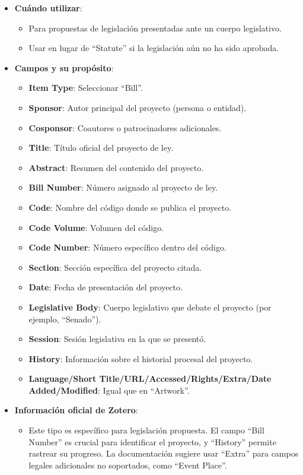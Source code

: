 \documentclass[
  jou,
  floatsintext,
  longtable,
  a4paper,
  nolmodern,
  notxfonts,
  notimes,
  colorlinks=true,linkcolor=blue,citecolor=blue,urlcolor=blue]{apa7}
\providecommand{\tightlist}{%
  \setlength{\itemsep}{0pt}\setlength{\parskip}{0pt}}
\begin{document}
\begin{itemize}
\tightlist
\item
  \textbf{Cuándo utilizar}:

  \begin{itemize}
  \tightlist
  \item
    Para propuestas de legislación presentadas ante un cuerpo
    legislativo.
  \item
    Usar en lugar de ``Statute'' si la legislación aún no ha sido
    aprobada.
  \end{itemize}
\item
  \textbf{Campos y su propósito}:

  \begin{itemize}
  \tightlist
  \item
    \textbf{Item Type}: Seleccionar ``Bill''.
  \item
    \textbf{Sponsor}: Autor principal del proyecto (persona o entidad).
  \item
    \textbf{Cosponsor}: Coautores o patrocinadores adicionales.
  \item
    \textbf{Title}: Título oficial del proyecto de ley.
  \item
    \textbf{Abstract}: Resumen del contenido del proyecto.
  \item
    \textbf{Bill Number}: Número asignado al proyecto de ley.
  \item
    \textbf{Code}: Nombre del código donde se publica el proyecto.
  \item
    \textbf{Code Volume}: Volumen del código.
  \item
    \textbf{Code Number}: Número específico dentro del código.
  \item
    \textbf{Section}: Sección específica del proyecto citada.
  \item
    \textbf{Date}: Fecha de presentación del proyecto.
  \item
    \textbf{Legislative Body}: Cuerpo legislativo que debate el proyecto
    (por ejemplo, ``Senado'').
  \item
    \textbf{Session}: Sesión legislativa en la que se presentó.
  \item
    \textbf{History}: Información sobre el historial procesal del
    proyecto.
  \item
    \textbf{Language/Short Title/URL/Accessed/Rights/Extra/Date
    Added/Modified}: Igual que en ``Artwork''.
  \end{itemize}
\item
  \textbf{Información oficial de Zotero}:

  \begin{itemize}
  \tightlist
  \item
    Este tipo es específico para legislación propuesta. El campo ``Bill
    Number'' es crucial para identificar el proyecto, y ``History''
    permite rastrear su progreso. La documentación sugiere usar
    ``Extra'' para campos legales adicionales no soportados, como
    ``Event Place''.
  \end{itemize}
\end{itemize}
\end{document}
